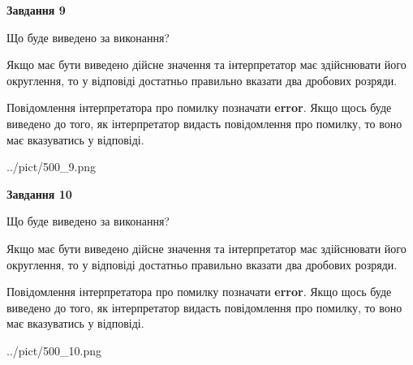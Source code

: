 \documentclass[12pt, ukrainian]{article}
\begin{document}
{\begin {Large}
{\begin {center}\textbf{Завдання 9}\end {center}}\par
Що буде виведено за виконання? \par

Якщо має бути виведено дійсне значення та інтерпретатор має здійснювати його округлення, 
то у відповіді достатньо правильно вказати два дробових розряди.

Повідомлення інтерпретатора про помилку позначати \textbf{error}.
Якщо щось буде виведено до того, як інтерпретатор видасть повідомлення про помилку, 
то воно має вказуватись у відповіді. \par

\begin{center}
	{../pict/500_9.png}
\end{center}
\newpage

{\begin {center}\textbf{Завдання 10}\end {center}}\par
Що буде виведено за виконання? \par

Якщо має бути виведено дійсне значення та інтерпретатор має здійснювати його округлення, 
то у відповіді достатньо правильно вказати два дробових розряди.

Повідомлення інтерпретатора про помилку позначати \textbf{error}.
Якщо щось буде виведено до того, як інтерпретатор видасть повідомлення про помилку, 
то воно має вказуватись у відповіді. \par

\begin{center}
	{../pict/500_10.png}
\end{center}
\newpage

\end {Large}}
\end{document}
